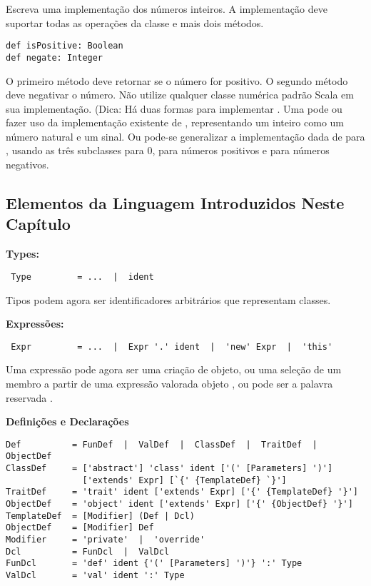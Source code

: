 \begin{exercise}
Escreva uma implementa\c{c}\~{a}o  dos n\'{u}meros inteiros. A implementa\c{c}\~{a}o deve
suportar todas as opera\c{c}\~{o}es da classe  e mais dois m\'{e}todos.

\begin{lstlisting}
def isPositive: Boolean
def negate: Integer
\end{lstlisting}

O primeiro m\'{e}todo deve retornar  se o n\'{u}mero for positivo. O segundo 
m\'{e}todo deve negativar o n\'{u}mero. N\~{a}o utilize qualquer classe num\'{e}rica padr\~{a}o Scala
em sua implementa\c{c}\~{a}o. (Dica: H\'{a} duas formas para implementar . Uma
pode ou fazer uso da implementa\c{c}\~{a}o existente de , representando um inteiro 
como um n\'{u}mero natural e um sinal. Ou pode-se generalizar a implementa\c{c}\~{a}o dada de 
 para , usando as tr\^{e}s subclasses  para 0, 
 para n\'{u}meros positivos e  para n\'{u}meros negativos. 
\end{exercise}

\subsection*{Elementos da Linguagem Introduzidos Neste Cap\'{i}tulo}
 \textbf{Types:}
 \begin{lstlisting}
 Type         = ...  |  ident
 \end{lstlisting}

Tipos podem agora ser identificadores arbitr\'{a}rios que representam classes.

\textbf{Express\~{o}es:}
 \begin{lstlisting}
 Expr         = ...  |  Expr '.' ident  |  'new' Expr  |  'this'
 \end{lstlisting}

Uma express\~{a}o pode agora ser uma cria\c{c}\~{a}o de objeto, ou uma sele\c{c}\~{a}o
 de um membro  a partir de uma express\~{a}o valorada objeto ,
ou pode ser a palavra reservada .

 \textbf{Defini\c{c}\~{o}es e Declara\c{c}\~{o}es}
\begin{lstlisting}
Def          = FunDef  |  ValDef  |  ClassDef  |  TraitDef  |  ObjectDef
ClassDef     = ['abstract'] 'class' ident ['(' [Parameters] ')'] 
               ['extends' Expr] [`{' {TemplateDef} `}']
TraitDef     = 'trait' ident ['extends' Expr] ['{' {TemplateDef} '}']
ObjectDef    = 'object' ident ['extends' Expr] ['{' {ObjectDef} '}']
TemplateDef  = [Modifier] (Def | Dcl)
ObjectDef    = [Modifier] Def
Modifier     = 'private'  |  'override'
Dcl          = FunDcl  |  ValDcl
FunDcl       = 'def' ident {'(' [Parameters] ')'} ':' Type
ValDcl       = 'val' ident ':' Type
\end{lstlisting}

